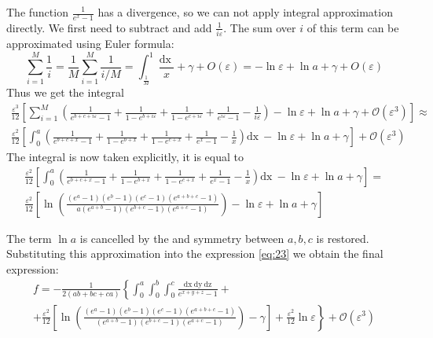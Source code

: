 \documentclass{article}
\newcommand{\dx}{\mathrm{dx}~}
\newcommand{\dy}{\mathrm{dy}~}
\newcommand{\dz}{\mathrm{dz}}
\begin{document}
The function $\frac{1}{e^{x}-1}$ has a divergence, so we can not apply integral approximation directly. We first need to 
subtract and add $\frac{1}{i\varepsilon}$. The sum over $i$ of this term can be approximated using Euler formula:
\begin{equation}
    \label{eq:24}
    \sum_{i=1}^{M}\frac{1}{i}=\frac{1}{M}\sum_{i=1}^{M}\frac{1}{i/M}=\int_{\frac{1}{M}}^{1}\frac{\dx}{x}+\gamma+O(\varepsilon)=-\ln\varepsilon+\ln a+\gamma+O(\varepsilon)
  \end{equation}
Thus we get the integral
\begin{multline}
  \label{eq:13}
    \frac{\varepsilon^{3}}{12}\left[\sum_{i=1}^{M}\left(     \frac{1}{e^{b+c+i\varepsilon}-1}+
      \frac{1}{1-e^{b+i\varepsilon}}+\frac{1}{1-e^{c+i\varepsilon}}+\frac{1}{e^{i\varepsilon}-1}-\frac{1}{i\varepsilon}\right)-\ln\varepsilon+\ln a+\gamma+\mathcal{O}(\varepsilon^{3})\right]\approx\\
   \frac{\varepsilon^{2}}{12}\left[\int_{0}^{a}\left(     \frac{1}{e^{b+c+x}-1}+
      \frac{1}{1-e^{b+x}}+\frac{1}{1-e^{c+x}}+\frac{1}{e^{x}-1}-\frac{1}{x}\right)\dx-\ln\varepsilon+\ln a+\gamma\right]+\mathcal{O}(\varepsilon^{3})    
\end{multline}
The integral is now taken explicitly, it is equal to
\begin{multline}
  \label{eq:22}
     \frac{\varepsilon^{2}}{12}\left[\int_{0}^{a}\left(     \frac{1}{e^{b+c+x}-1}+
         \frac{1}{1-e^{b+x}}+\frac{1}{1-e^{c+x}}+\frac{1}{e^{x}-1}-\frac{1}{x}\right)\dx-\ln\varepsilon+\ln a+\gamma\right]=\\
     \frac{\varepsilon^{2}}{12}\left[\ln \left(\frac{(e^{a}-1)(e^{b}-1)(e^{c}-1)(e^{a+b+c}-1)}{a (e^{a+b}-1)(e^{b+c}-1)(e^{a+c}-1)}\right)-\ln\varepsilon+\ln a+\gamma\right]
\end{multline}

  

The term $\ln a$ is cancelled by the  and symmetry between $a,b,c$ is restored.
Substituting this approximation into the expression \eqref{eq:23} we obtain 
 the final expression:
\begin{multline}
  \label{eq:3}
 f=-\frac{1}{2(ab+bc+ca)}\left\{\int_{0}^{a} \int_{0}^{b}\int_{0}^{c}\frac{\dx \dy \dz}{e^{x+y+z}-1}+\right.\\
  \left.+\frac{\varepsilon^{2}}{12}\left[\ln\left(\frac{(e^{a}-1)(e^{b}-1)(e^{c}-1)(e^{a+b+c}-1)}{(e^{a+b}-1)(e^{b+c}-1)(e^{a+c}-1)}\right)-
      \gamma\right]+\frac{\varepsilon^{2}}{12}\ln \varepsilon\right\} +\mathcal{O}(\varepsilon^{3})
\end{multline}
\end{document}
